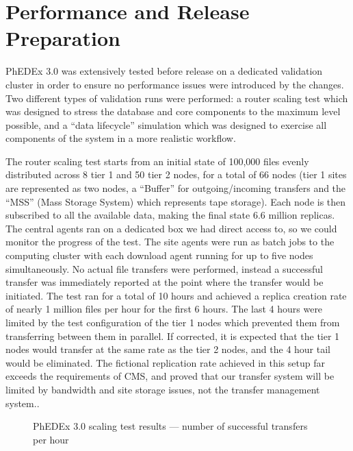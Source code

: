 \documentclass{PoS}
\begin{document}
\section{Performance and Release Preparation}

PhEDEx 3.0 was extensively tested before release on a dedicated
validation cluster in order to ensure no performance issues were
introduced by the changes.  Two different types of validation runs
were performed: a router scaling test which was designed to stress the
database and core components to the maximum level possible, and a
``data lifecycle'' simulation which was designed to exercise all
components of the system in a more realistic workflow.

The router scaling test starts from an initial state of 100,000 files
evenly distributed across 8 tier 1 and 50 tier 2 nodes, for a total of
66 nodes (tier 1 sites are represented as two nodes, a ``Buffer'' for
outgoing/incoming transfers and the ``MSS'' (Mass Storage System)
which represents tape storage).  Each node is then subscribed to all
the available data, making the final state 6.6 million replicas.  The
central agents ran on a dedicated box we had direct access to, so we
could monitor the progress of the test.  The site agents were run as
batch jobs to the computing cluster with each download agent running
for up to five nodes simultaneously.  No actual file transfers were
performed, instead a successful transfer was immediately reported at
the point where the transfer would be initiated.  The test ran for a
total of 10 hours and achieved a replica creation rate of nearly 1
million files per hour for the first 6 hours.  The last 4 hours were
limited by the test configuration of the tier 1 nodes which prevented
them from transferring between them in parallel.  If corrected, it is
expected that the tier 1 nodes would transfer at the same rate as the
tier 2 nodes, and the 4 hour tail would be eliminated.  The fictional
replication rate achieved in this setup far exceeds the requirements
of CMS, and proved that our transfer system will be limited by
bandwidth and site storage issues, not the transfer management system..

\begin{figure}[htp] 
\centering
\setlength\fboxsep{0pt} 
\setlength\fboxrule{0.5pt} 
\caption{PhEDEx 3.0 scaling test results --- number of successful transfers per hour}
\label{fig:scaling08}
\end{figure} 
\end{document}
